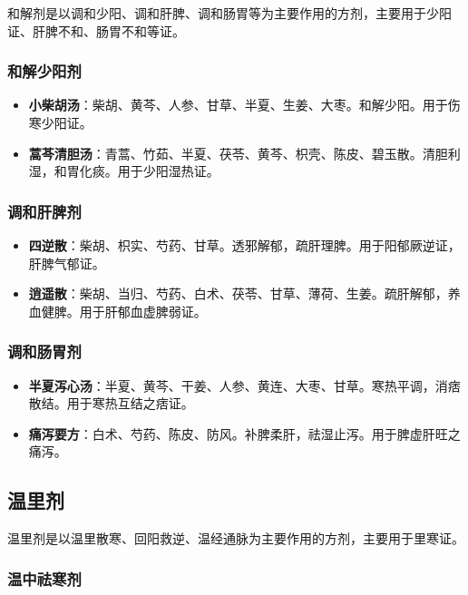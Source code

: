 \documentclass[12pt,UTF8]{ctexbook}
\begin{document}
和解剂是以调和少阳、调和肝脾、调和肠胃等为主要作用的方剂，主要用于少阳证、肝脾不和、肠胃不和等证。

\subsubsection{和解少阳剂}

\begin{itemize}
\item \textbf{小柴胡汤}：柴胡、黄芩、人参、甘草、半夏、生姜、大枣。和解少阳。用于伤寒少阳证。
\item \textbf{蒿芩清胆汤}：青蒿、竹茹、半夏、茯苓、黄芩、枳壳、陈皮、碧玉散。清胆利湿，和胃化痰。用于少阳湿热证。
\end{itemize}

\subsubsection{调和肝脾剂}

\begin{itemize}
\item \textbf{四逆散}：柴胡、枳实、芍药、甘草。透邪解郁，疏肝理脾。用于阳郁厥逆证，肝脾气郁证。
\item \textbf{逍遥散}：柴胡、当归、芍药、白术、茯苓、甘草、薄荷、生姜。疏肝解郁，养血健脾。用于肝郁血虚脾弱证。
\end{itemize}

\subsubsection{调和肠胃剂}

\begin{itemize}
\item \textbf{半夏泻心汤}：半夏、黄芩、干姜、人参、黄连、大枣、甘草。寒热平调，消痞散结。用于寒热互结之痞证。
\item \textbf{痛泻要方}：白术、芍药、陈皮、防风。补脾柔肝，祛湿止泻。用于脾虚肝旺之痛泻。
\end{itemize}

\subsection{温里剂}

温里剂是以温里散寒、回阳救逆、温经通脉为主要作用的方剂，主要用于里寒证。

\subsubsection{温中祛寒剂}
\end{document}
